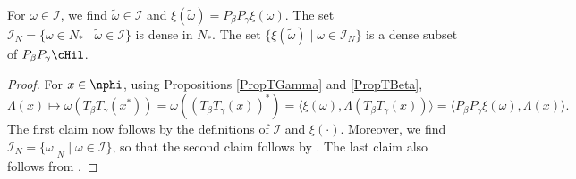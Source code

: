 \begin{prop}\label{PropDualSqInt}
  For $\omega \in \mathcal{I}$, we find $\tilde{\omega}  \in \mathcal{I}$ and $\xi(\tilde{\omega}  ) = P_\beta P_\gamma \xi(\omega)$. The set $\mathcal{I}_N = \{ \omega \in N_\ast \mid \tilde{\omega} \in \mathcal{I} \}$ is dense in $N_\ast$. The set $\{ \xi(\tilde{\omega}) \mid \omega \in \mathcal{I}_N \}$ is a dense subset of $P_\beta P_\gamma \cHil$.
\end{prop}
\begin{proof}
For $x \in \nphi$, using Propositions \ref{PropTGamma} and \ref{PropTBeta},
\[
 \Lambda(x) \mapsto \omega (T_\beta  T_\gamma(x^\ast)) =   \omega ((T_\beta T_\gamma(x))^\ast) = \langle \xi(\omega), \Lambda(T_\beta T_\gamma(x)) \rangle = \langle P_\beta P_\gamma \xi(\omega), \Lambda(x) \rangle.
\]
The f\/irst claim now follows by the def\/initions of $\mathcal{I}$ and $\xi(\cdot)$. Moreover, we f\/ind $\mathcal{I}_N = \{ \omega\vert_N \mid \omega \in \mathcal{I} \}$, so that the second claim follows by \cite[Lemma 8.5]{KusVae}. The last claim also follows from \cite[Lemma 8.5]{KusVae}.
\end{proof}



